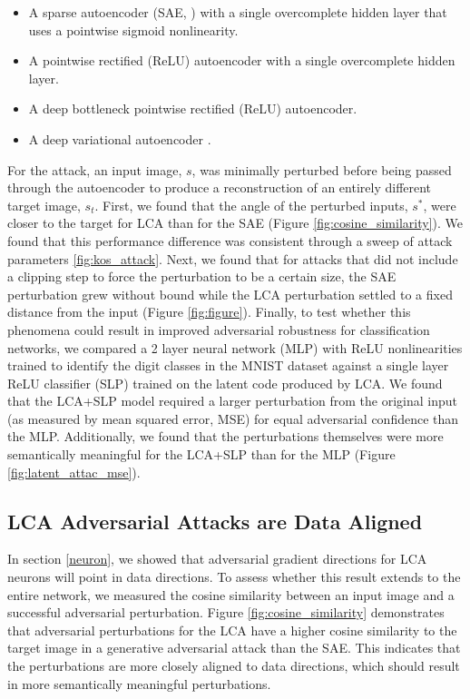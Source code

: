 \begin{itemize}
  \item A sparse autoencoder (SAE, \cite{ng2011sparse}) with a single overcomplete hidden layer that uses a pointwise sigmoid nonlinearity.
  \item A pointwise rectified (ReLU) autoencoder \cite{citation} with a single overcomplete hidden layer.
  \item A deep bottleneck pointwise rectified (ReLU) autoencoder.
  \item A deep variational autoencoder \cite{kingma2013auto}.
\end{itemize}

  For the attack, an input image, $s$, was minimally perturbed before being passed through the autoencoder to produce a reconstruction of an entirely different target image, $s_{t}$. First, we found that the angle of the perturbed inputs, $s^{*}$, were closer to the target for LCA than for the SAE (Figure \ref{fig:cosine_similarity}). We found that this performance difference was consistent through a sweep of attack parameters \ref{fig:kos_attack}. Next, we found that for attacks that did not include a clipping step to force the perturbation to be a certain size, the SAE perturbation grew without bound while the LCA perturbation settled to a fixed distance from the input (Figure \ref{fig:figure}). Finally, to test whether this phenomena could result in improved adversarial robustness for classification networks, we compared a 2 layer neural network (MLP) with ReLU nonlinearities trained to identify the digit classes in the MNIST dataset against a single layer ReLU classifier (SLP) trained on the latent code produced by LCA. We found that the LCA+SLP model required a larger perturbation from the original input (as measured by mean squared error, MSE) for equal adversarial confidence than the MLP. Additionally, we found that the perturbations themselves were more semantically meaningful for the LCA+SLP than for the MLP (Figure \ref{fig:latent_attac_mse}).


\subsection{LCA Adversarial Attacks are Data Aligned}
In section \ref{neuron}, we showed that adversarial gradient directions for LCA neurons will point in data directions. To assess whether this result extends to the entire network, we measured the cosine similarity between an input image and a successful adversarial perturbation. Figure \ref{fig:cosine_similarity} demonstrates that adversarial perturbations for the LCA have a higher cosine similarity to the target image in a generative adversarial attack \cite{kos2018adversarial} than the SAE. This indicates that the perturbations are more closely aligned to data directions, which should result in more semantically meaningful perturbations.

